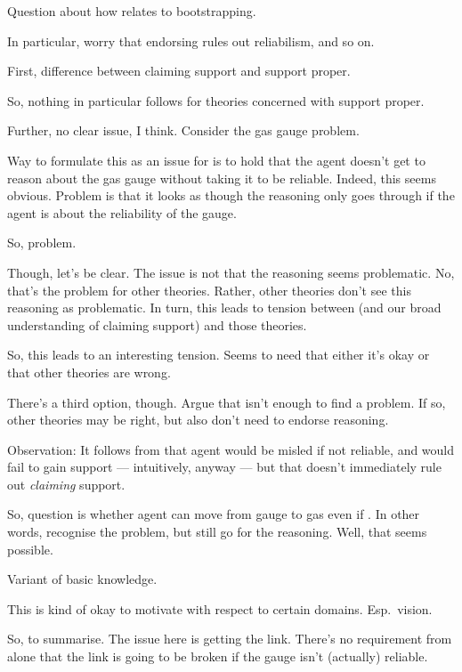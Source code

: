 \begin{note}[Bootstrapping]
  Question about how \eiS{} relates to bootstrapping.

  In particular, worry that endorsing \eiS{} rules out reliabilism, and so on.

  First, difference between claiming support and support proper.

  So, nothing in particular follows for theories concerned with support proper.

  Further, no clear issue, I think.
  Consider the gas gauge problem.

  Way to formulate this as an issue for \eiS{} is to hold that the agent doesn't get to reason about the gas gauge without taking it to be reliable.
  Indeed, this seems obvious.
  Problem is that it looks as though the reasoning only goes through if the agent is \nmom{} about the reliability of the gauge.

  So, problem.

  Though, let's be clear.
  The issue is not that the reasoning seems problematic.
  No, that's the problem for other theories.
  Rather, other theories don't see this reasoning as problematic.
  In turn, this leads to tension between \eiS{} (and our broad understanding of claiming support) and those theories.

  So, this leads to an interesting tension.
  Seems to need that either it's okay or that other theories are wrong.

  There's a third option, though.
  Argue that \eiS{} isn't enough to find a problem.
  If so, other theories may be right, but also don't need to endorse reasoning.

  Observation: It follows from \eiS{} that agent would be misled if not reliable, and would fail to gain support --- intuitively, anyway --- but that doesn't immediately rule out \emph{claiming} support.

  So, question is whether agent can move from gauge to gas even if \mom{}.
  In other words, recognise the problem, but still go for the reasoning.
  Well, that seems possible.

  Variant of basic knowledge.

  This is kind of okay to motivate with respect to certain domains.
  Esp.\ vision.

  So, to summarise.
  The issue here is getting the link.
  There's no requirement from \eiS{} alone that the link is going to be broken if the gauge isn't (actually) reliable.
\end{note}


